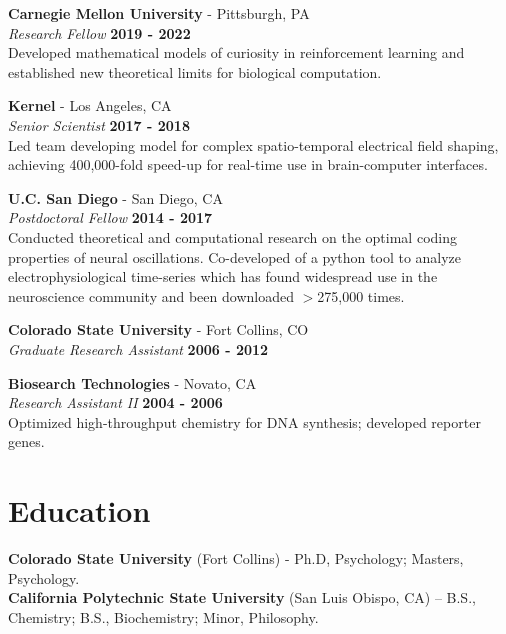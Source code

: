 \documentclass[margin,line]{res}
\begin{document}
\begin{resume}

\vspace{-.25cm}
{\bf Carnegie Mellon University} - Pittsburgh, PA\\
{\em Research Fellow} \hfill {\bf 2019 - 2022}\\
Developed mathematical models of curiosity in reinforcement learning and established new theoretical limits for biological computation.

\vspace{-.25cm}
{\bf Kernel} - Los Angeles, CA\\
{\em Senior Scientist} \hfill {\bf 2017 - 2018}\\
Led team developing model for complex spatio-temporal electrical field shaping, achieving 400,000-fold speed-up for real-time use in brain-computer interfaces.

\vspace{-.25cm}
{\bf U.C. San Diego} - San Diego, CA\\
{\em Postdoctoral Fellow} \hfill {\bf 2014 - 2017}\\
Conducted theoretical and computational research on the optimal coding properties of neural oscillations. Co-developed of a python tool to analyze electrophysiological time-series which has found widespread use in the neuroscience community and been downloaded $>$275,000 times.

\vspace{-.25cm}
{\bf Colorado State University} - Fort Collins, CO\\
{\em Graduate Research Assistant} \hfill {\bf 2006 - 2012}

\vspace{-.25cm}
{\bf Biosearch Technologies} - Novato, CA\\
{\em Research Assistant II} \hfill {\bf 2004 - 2006}\\
Optimized high-throughput chemistry for DNA synthesis; developed reporter genes.

\vspace{-.25cm}
\section{\sc Education}
{\bf Colorado State University} (Fort Collins) - Ph.D, Psychology; Masters, Psychology.\\

\vspace*{-.3in}
{\bf California Polytechnic State University} (San Luis Obispo, CA) -- B.S., Chemistry; B.S., Biochemistry; Minor, Philosophy.\\


\end{resume}
\end{document}
